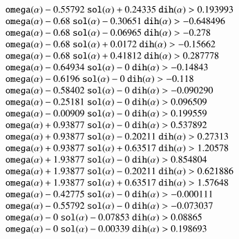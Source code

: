 $$\begin{array}{lll}
   \optt{omega}(\alpha) - 0.55792\ \optt{sol}(\alpha) + 0.24335\ \optt{dih}(\alpha) > 0.193993\\
   \optt{omega}(\alpha) - 0.68\ \optt{sol}(\alpha) - 0.30651\ \optt{dih}(\alpha) > -0.648496\\
   \optt{omega}(\alpha) - 0.68\ \optt{sol}(\alpha) - 0.06965\ \optt{dih}(\alpha) > -0.278\\
   \optt{omega}(\alpha) - 0.68\ \optt{sol}(\alpha) + 0.0172\ \optt{dih}(\alpha) > -0.15662\\
   \optt{omega}(\alpha) - 0.68\ \optt{sol}(\alpha) + 0.41812\ \optt{dih}(\alpha) > 0.287778\\
   \optt{omega}(\alpha) - 0.64934\ \optt{sol}(\alpha) - 0\ \optt{dih}(\alpha) > -0.14843\\
   \optt{omega}(\alpha) - 0.6196\ \optt{sol}(\alpha) - 0\ \optt{dih}(\alpha) > -0.118\\
   \optt{omega}(\alpha) - 0.58402\ \optt{sol}(\alpha) - 0\ \optt{dih}(\alpha) > -0.090290\\
   \optt{omega}(\alpha) - 0.25181\ \optt{sol}(\alpha) - 0\ \optt{dih}(\alpha) > 0.096509\\
   \optt{omega}(\alpha) - 0.00909\ \optt{sol}(\alpha) - 0\ \optt{dih}(\alpha) > 0.199559\\
   \optt{omega}(\alpha) + 0.93877\ \optt{sol}(\alpha) - 0\ \optt{dih}(\alpha) > 0.537892\\
   \optt{omega}(\alpha) + 0.93877\ \optt{sol}(\alpha) - 0.20211\ \optt{dih}(\alpha) > 0.27313\\
   \optt{omega}(\alpha) + 0.93877\ \optt{sol}(\alpha) + 0.63517\ \optt{dih}(\alpha) > 1.20578\\
   \optt{omega}(\alpha) + 1.93877\ \optt{sol}(\alpha) - 0\ \optt{dih}(\alpha) > 0.854804\\
   \optt{omega}(\alpha) + 1.93877\ \optt{sol}(\alpha) - 0.20211\ \optt{dih}(\alpha) > 0.621886\\
   \optt{omega}(\alpha) + 1.93877\ \optt{sol}(\alpha) + 0.63517\ \optt{dih}(\alpha) > 1.57648\\
   \optt{omega}(\alpha) - 0.42775\ \optt{sol}(\alpha) - 0\ \optt{dih}(\alpha) > -0.000111\\
   \optt{omega}(\alpha) - 0.55792\ \optt{sol}(\alpha) - 0\ \optt{dih}(\alpha) > -0.073037\\
   \optt{omega}(\alpha) - 0\ \optt{sol}(\alpha) - 0.07853\ \optt{dih}(\alpha) > 0.08865\\
   \optt{omega}(\alpha) - 0\ \optt{sol}(\alpha) - 0.00339\ \optt{dih}(\alpha) > 0.198693\\

\end{array}$$
